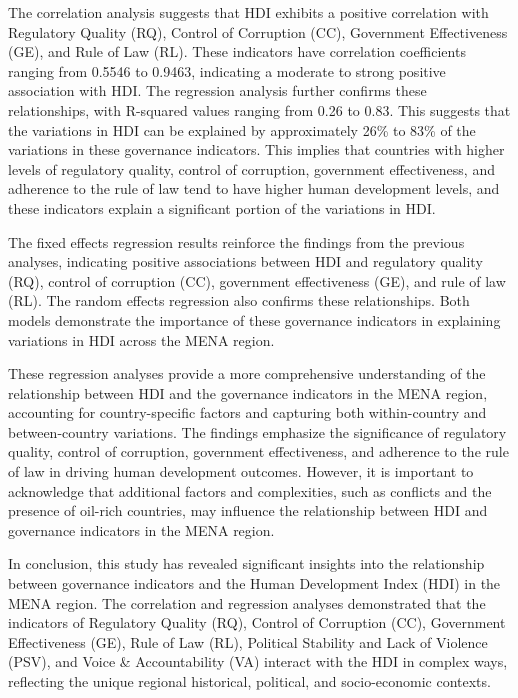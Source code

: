 \documentclass[
  12pt,
]{article}
\begin{document}
The correlation analysis suggests that HDI exhibits a positive correlation with Regulatory Quality (RQ), Control of Corruption (CC), Government Effectiveness (GE), and Rule of Law (RL). These indicators have correlation coefficients ranging from 0.5546 to 0.9463, indicating a moderate to strong positive association with HDI. The regression analysis further confirms these relationships, with R-squared values ranging from 0.26 to 0.83. This suggests that the variations in HDI can be explained by approximately 26\% to 83\% of the variations in these governance indicators. This implies that countries with higher levels of regulatory quality, control of corruption, government effectiveness, and adherence to the rule of law tend to have higher human development levels, and these indicators explain a significant portion of the variations in HDI.

The fixed effects regression results reinforce the findings from the previous analyses, indicating positive associations between HDI and regulatory quality (RQ), control of corruption (CC), government effectiveness (GE), and rule of law (RL). The random effects regression also confirms these relationships. Both models demonstrate the importance of these governance indicators in explaining variations in HDI across the MENA region.

These regression analyses provide a more comprehensive understanding of the relationship between HDI and the governance indicators in the MENA region, accounting for country-specific factors and capturing both within-country and between-country variations. The findings emphasize the significance of regulatory quality, control of corruption, government effectiveness, and adherence to the rule of law in driving human development outcomes. However, it is important to acknowledge that additional factors and complexities, such as conflicts and the presence of oil-rich countries, may influence the relationship between HDI and governance indicators in the MENA region.

In conclusion, this study has revealed significant insights into the relationship between governance indicators and the Human Development Index (HDI) in the MENA region. The correlation and regression analyses demonstrated that the indicators of Regulatory Quality (RQ), Control of Corruption (CC), Government Effectiveness (GE), Rule of Law (RL), Political Stability and Lack of Violence (PSV), and Voice \& Accountability (VA) interact with the HDI in complex ways, reflecting the unique regional historical, political, and socio-economic contexts.
\end{document}
